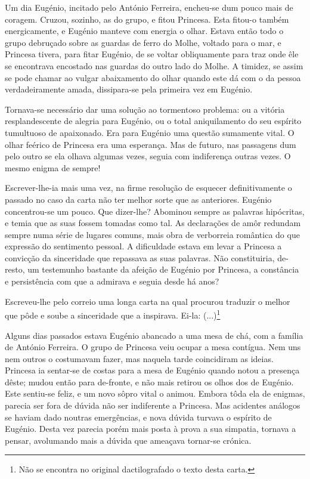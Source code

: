 \documentclass[9pt]{article}
\begin{document}
Um dia Eugé\-nio, incitado pelo António Ferreira, encheu-se dum pouco
mais de coragem. Cruzou, sozinho, as do grupo, e fitou Princesa. Esta fitou-o
também energicamente, e Eugé\-nio manteve com energia o o\-lhar. Estava então
todo o grupo debruçado sobre as guardas de ferro do Mo\-lhe, voltado para o
mar, e Princesa tivera, para fitar Eugé\-nio, de se voltar obliquamente para
traz onde êle se encontrava encostado nas guardas do outro lado do Mo\-lhe.
A timidez, se assim se pode chamar ao vulgar abaixamento do o\-lhar quan\-do
este dá com o da pessoa verdadeiramente amada, dissipara-se pela primeira
vez em Eugé\-nio.

Tornava-se necessário dar uma solu\-ção ao tormentoso problema: ou a
vitória resplandescente de alegria para Eugé\-nio, ou o total aniquilamento
do seu espírito tumultuoso de apaixonado. Era para Eugé\-nio uma questão sumamente vital. O o\-lhar feérico de Princesa era uma esperan\-ça. Mas de
futuro, nas passagens dum pelo outro se ela o\-lhava algumas vezes, seguia com indiferença outras vezes. O mesmo enigma de sempre!

Escrever-\-lhe-ia mais uma vez, na firme resolu\-ção de esque\-cer definitivamente o passado no caso da carta não ter me\-lhor sorte que as
anteriores. Eugé\-nio concentrou-se um pouco. Que dizer-\-lhe? Abominou
sempre as palavras hipócritas, e temia que as suas fossem tomadas como
tal. As declara\-ções de amôr redundam sempre numa série de lugares
comuns, mais obra de verborreia romântica do que ex\-pres\-são do sentimento pessoal. A dificuldade estava em levar a Princesa a convic\-ção da
sinceridade que repassava as suas palavras. Não constituiria, de-resto, um testemunho bastante da afei\-ção de Eugé\-nio por Princesa, a constância e persistência com que a admirava e seguia desde há anos?

Escreveu-\-lhe pelo correio uma longa carta na qual procurou traduzir o me\-lhor que pôde e soube a sinceridade que a inspirava. Ei-la:
 (...)\footnote{Não se encontra no original dactilografado o texto desta carta. }


Alguns dias passados estava Eugé\-nio abancado a uma mesa de chá,
com a família de António Ferreira. O grupo de Princesa veiu ocupar a
mesa contígua. Nem uns nem outros o costumavam fazer, mas naquela tarde coincidiram as ideias. Princesa ia sentar-se de costas para a mesa de Eugénio quan\-do notou a presença dêste; mudou então para de-fronte, e não mais retirou os o\-lhos dos de Eugé\-nio. Este sentiu-se feliz,
e um novo sôpro vital o animou. Embora tôda ela de enigmas, parecia ser
fora de dúvida não ser indiferente a Princesa. Mas acidentes análogos se haviam dado noutras emergências, e nova dúvida turvava o espírito de Eugé\-nio. Desta vez parecia porém mais posta à prova a sua
simpatia, tornava a pensar, avolumando mais a dúvida que ameaçava tornar-se crónica.
\end{document}
